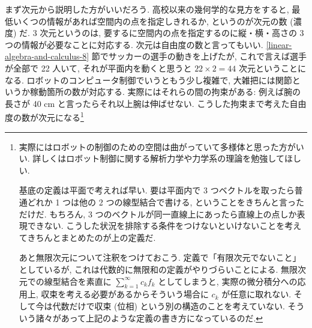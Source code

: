 \documentclass[openany, a4paper, oneside]{jsbook}
\begin{document}
まず次元から説明した方がいいだろう.
高校以来の幾何学的な見方をすると,
最低いくつの情報があれば空間内の点を指定しきれるか, というのが次元の数 (濃度) だ.
3 次元というのは, 要するに空間内の点を指定するのに縦・横・高さの 3 つの情報が必要なことに対応する.
次元は自由度の数と言ってもいい.
\ref{linear-algebra-and-calculus-8} 節でサッカーの選手の動きを上げたが,
これで言えば選手が全部で 22 人いて, それが平面内を動くと思うと $22 \times 2 = 44$ 次元ということになる.
ロボットのコンピュータ制御でいうともう少し複雑で,
大雑把には関節というか稼動箇所の数が対応する.
実際にはそれらの間の拘束がある: 例えば腕の長さが 40 cm と言ったらそれ以上腕は伸ばせない.
こうした拘束まで考えた自由度の数が次元になる\footnote{実際にはロボットの制御のための空間は曲がっていて多様体と思った方がいい.
詳しくはロボット制御に関する解析力学や力学系の理論を勉強してほしい.

基底の定義は平面で考えれば早い.
要は平面内で 3 つベクトルを取ったら普通どれか 1 つは他の
2 つの線型結合で書ける, ということをきちんと言っただけだ.
もちろん, 3 つのベクトルが同一直線上にあったら直線上の点しか表現できない.
こうした状況を排除する条件をつけないといけないことを考えてきちんとまとめたのが上の定義だ.

あと無限次元について注釈をつけておこう.
定義で「有限次元でないこと」としているが, これは代数的に無限和の定義がやりづらいことによる\footnotemark.
無限次元での線型結合を素直に $\sum_{k=1}^{\infty} c_k f_k$ としてしまうと,
実際の微分積分への応用上, 収束を考える必要があるからそういう場合に $c_k$ が任意に取れない.
そして今は代数だけで収束 (位相) という別の構造のことを考えていない.
そういう諸々があって上記のような定義の書き方になっているのだ.}
\end{document}
